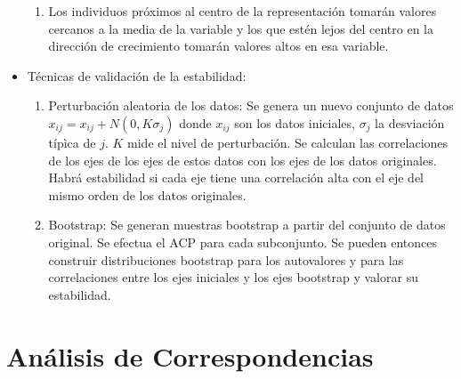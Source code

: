 \documentclass{article}
\begin{document}
\begin{itemize}
\begin{enumerate}
              \item Los individuos próximos al centro de la representación tomarán valores cercanos a la media de la variable y los que estén lejos del centro en la dirección de crecimiento tomarán valores altos en esa variable.
          \end{enumerate}
    \item Técnicas de validación de la estabilidad:
          \begin{enumerate}
              \item Perturbación aleatoria de los datos: Se genera un nuevo conjunto de datos $x_{ij}=x_{ij}+N(0,K\sigma_j)$ donde $x_{ij}$ son los datos iniciales, $\sigma_j$ la desviación típìca de $j$. $K$ mide el nivel de perturbación. Se calculan las correlaciones de los ejes de los ejes de estos datos con los ejes de los datos originales. Habrá estabilidad si cada eje tiene una correlación alta con el eje del mismo orden de los datos originales.
              \item  Bootstrap: Se generan muestras bootstrap a partir del conjunto de datos original. Se efectua el ACP para cada subconjunto. Se pueden entonces construir distribuciones bootstrap para los autovalores y para las correlaciones entre los ejes iniciales y los ejes bootstrap y valorar su estabilidad.
          \end{enumerate}
\end{itemize}

\newpage

\section{Análisis de Correspondencias}
\end{document}
